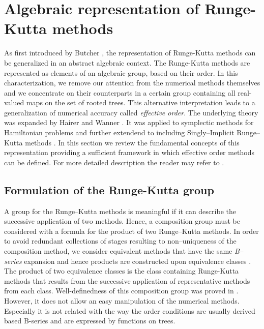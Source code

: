 \section{Algebraic representation of Runge-Kutta methods}\label{sec:Algebraic_RK}

\indent As first introduced by Butcher \cite{Butcher1969}, the representation of Runge-Kutta methods can be generalized in an abstract algebraic context. The Runge-Kutta methods are represented as elements of an algebraic group, based on their order. In this characterization, we remove our attention from the numerical methods themselves and we concentrate on their counterparts in a certain group containing all real-valued maps on the set of rooted trees. This alternative interpretation leads to a generalization of numerical accuracy called \emph{effective order}. The underlying theory was expanded by Hairer and Wanner \cite{Hairer1974}. It was applied to symplectic methods for Hamiltonian problems \cite{Lopez1996} and further extendend to including Singly--Implicit Runge--Kutta methods \cite{Butcher1997, Butcher1999}. In this section we review the fundamental concepts of this representation providing a sufficient framework in which effective order methods can be defined. For more detailed description the reader may refer to \cite{Butcher2008_book, Butcher1972}.

\subsection{Formulation of the Runge-Kutta group}\label{sec:RK_group}

\indent A group for the Runge--Kutta methods is meaningful if it can describe the successive application of two methods. Hence, a composition group must be considered with a formula for the product of two Runge--Kutta methods. In order to avoid redundant collections of stages resulting to non--uniqueness of the composition method, we consider equivalent methods that have the same \emph{B--series} expansion and hence products are constructed upon equivalence classes \cite{Butcher1987_book, Butcher2008_book}. The product of two equivalence classes is the class containing Runge-Kutta methods that results from the successive application of representative methods from each class.  Well-definedness of this composition group was proved in \cite{Butcher1972}. However, it does not allow an easy manipulation of the numerical methods. Especially it is not related with the way the order conditions are usually derived based B-series and are expressed by functions on trees. 


